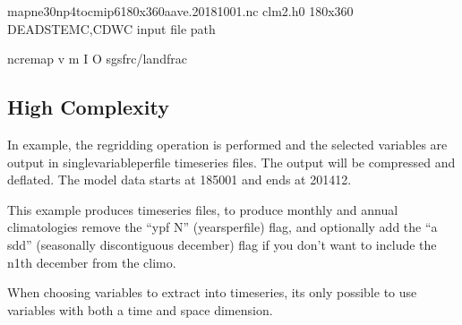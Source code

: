 \documentclass[letterpaper,10pt,english]{sphinxmanual}
\begin{document}
\begin{sphinxVerbatim}[commandchars=\\\{\}]
map\PYGZus{}ne30np4\PYGZus{}to\PYGZus{}cmip6\PYGZus{}180x360\PYGZus{}aave.20181001.nc   
clm2.h0                                       
180x360                                      
DEADSTEMC,CDWC                                     
\PYGZlt{}input file path\PYGZgt{}                             

ncremap \PYGZhy{}v  \PYGZhy{}m  \PYGZhy{}I  \PYGZhy{}O  \PYGZhy{}\PYGZhy{}sgs\PYGZus{}frc/landfrac
\end{sphinxVerbatim}


\subsection{High Complexity}
\label{\detokenize{lnd_regrid:high-complexity}}
In example, the regridding operation is performed and the selected variables are output in single\sphinxhyphen{}variable\sphinxhyphen{}per\sphinxhyphen{}file time\sphinxhyphen{}series files.
The output will be compressed and deflated. The model data starts at 1850\sphinxhyphen{}01 and ends at 2014\sphinxhyphen{}12.

This example produces time\sphinxhyphen{}series files, to produce monthly and annual climatologies remove the “\textendash{}ypf N” (years\sphinxhyphen{}per\sphinxhyphen{}file) flag, and optionally
add the “\sphinxhyphen{}a sdd” (seasonally discontiguous december) flag if you don’t want to include the n\sphinxhyphen{}1th december from the climo.

When choosing variables to extract into time\sphinxhyphen{}series, its only possible to use variables with both a time and space dimension.
\end{document}
